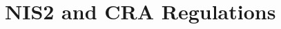 \documentclass[../main.tex]{subfiles}
\begin{document}
\chapter{NIS2 and CRA Regulations}
\label{ch:nis2-cra-regulations}

\end{document}

